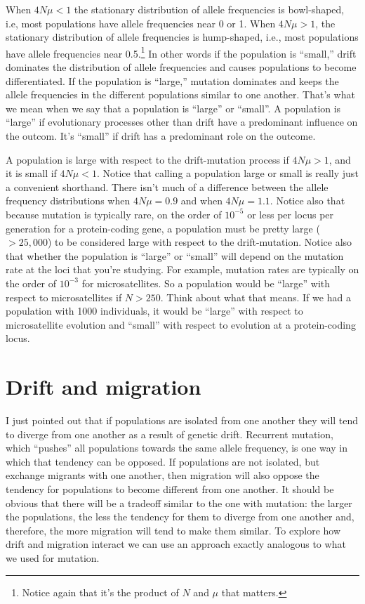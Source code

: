 \documentclass[12pt]{article}
\begin{document}
When $4N\mu < 1$ the stationary distribution of allele frequencies is
bowl-shaped, i.e, most populations have allele frequencies near 0 or
1. When $4N\mu > 1$, the stationary distribution of allele frequencies
is hump-shaped, i.e., most populations have allele frequencies near
0.5.\footnote{Notice again that it's the product of $N$ and $\mu$ that
  matters.} In other words if the population is ``small,'' drift
dominates the distribution of allele frequencies and causes
populations to become differentiated. If the population is ``large,''
mutation dominates and keeps the allele frequencies in the different
populations similar to one another. That's what we mean when we say
that a population is ``large'' or ``small''. A population is ``large''
if evolutionary processes other than drift have a predominant
influence on the outcom. It's ``small'' if drift has a predominant
role on the outcome.

A population is large with respect to the drift-mutation process if
$4N\mu > 1$, and it is small if $4N\mu < 1$. Notice that calling a
population large or small is really just a convenient shorthand. There
isn't much of a difference between the allele frequency distributions
when $4N\mu = 0.9$ and when $4N\mu = 1.1$. Notice also that because
mutation is typically rare, on the order of $10^{-5}$ or less per
locus per generation for a protein-coding gene, a population must be
pretty large ($> 25,000$) to be considered large with respect to the
drift-mutation. Notice also that whether the population is ``large''
or ``small'' will depend on the mutation rate at the loci that you're
studying. For example, mutation rates are typically on the order of 
$10^{-3}$ for microsatellites. So a population would be ``large'' with
respect to microsatellites if $N > 250$. Think about what that
means. If we had a population with 1000 individuals, it would be
``large'' with respect to microsatellite evolution and ``small'' with
respect to evolution at a protein-coding locus.

\section*{Drift and migration}

I just pointed out that if populations are isolated from one another
they will tend to diverge from one another as a result of genetic
drift. Recurrent mutation, which ``pushes'' all populations towards
the same allele frequency, is one way in which that tendency can be
opposed. If populations are not isolated, but exchange migrants with
one another, then migration will also oppose the tendency for
populations to become different from one another. It should be obvious
that there will be a tradeoff similar to the one with mutation: the
larger the populations, the less the tendency for them to diverge from
one another and, therefore, the more migration will tend to make them
similar. To explore how drift and migration interact we can use an
approach exactly analogous to what we used for mutation.
\end{document}
